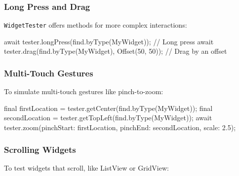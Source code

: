 \documentclass[
]{article}
\newenvironment{Shaded}{\begin{snugshade}}{\end{snugshade}}
\newcommand{\AttributeTok}[1]{\textcolor[rgb]{0.16,0.50,0.73}{#1}}
\newcommand{\CommentTok}[1]{\textcolor[rgb]{0.48,0.49,0.49}{#1}}
\newcommand{\DecValTok}[1]{\textcolor[rgb]{0.96,0.45,0.00}{#1}}
\newcommand{\FloatTok}[1]{\textcolor[rgb]{0.96,0.45,0.00}{#1}}
\newcommand{\NormalTok}[1]{\textcolor[rgb]{0.81,0.81,0.76}{#1}}
\newcommand{\OperatorTok}[1]{\textcolor[rgb]{0.81,0.81,0.76}{#1}}
\begin{document}
\subsubsection{Long Press and Drag}\label{long-press-and-drag}

\texttt{WidgetTester} offers methods for more complex interactions:

\begin{Shaded}
\begin{Highlighting}[]
\AttributeTok{await}\NormalTok{ tester}\OperatorTok{.}\NormalTok{longPress(find}\OperatorTok{.}\NormalTok{byType(MyWidget)); }\CommentTok{// Long press}
\AttributeTok{await}\NormalTok{ tester}\OperatorTok{.}\NormalTok{drag(find}\OperatorTok{.}\NormalTok{byType(MyWidget)}\OperatorTok{,}\NormalTok{ Offset(}\DecValTok{50}\OperatorTok{,} \DecValTok{50}\NormalTok{)); }\CommentTok{// Drag by an offset}
\end{Highlighting}
\end{Shaded}

\subsubsection{Multi-Touch Gestures}\label{multi-touch-gestures}

To simulate multi-touch gestures like pinch-to-zoom:

\begin{Shaded}
\begin{Highlighting}[]
\AttributeTok{final}\NormalTok{ firstLocation }\OperatorTok{=}\NormalTok{ tester}\OperatorTok{.}\NormalTok{getCenter(find}\OperatorTok{.}\NormalTok{byType(MyWidget));}
\AttributeTok{final}\NormalTok{ secondLocation }\OperatorTok{=}\NormalTok{ tester}\OperatorTok{.}\NormalTok{getTopLeft(find}\OperatorTok{.}\NormalTok{byType(MyWidget));}
\AttributeTok{await}\NormalTok{ tester}\OperatorTok{.}\NormalTok{zoom(pinchStart}\OperatorTok{:}\NormalTok{ firstLocation}\OperatorTok{,}\NormalTok{ pinchEnd}\OperatorTok{:}\NormalTok{ secondLocation}\OperatorTok{,}\NormalTok{ scale}\OperatorTok{:} \FloatTok{2.5}\NormalTok{);}
\end{Highlighting}
\end{Shaded}

\subsubsection{Scrolling Widgets}\label{scrolling-widgets}

To test widgets that scroll, like ListView or GridView:
\end{document}
